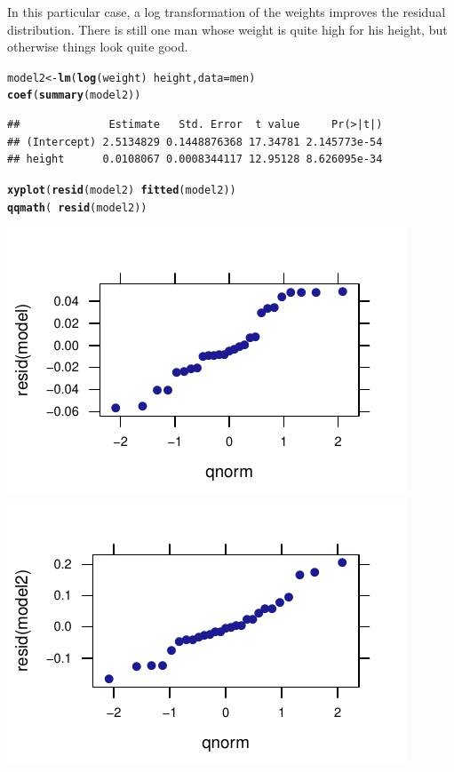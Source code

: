 \documentclass[twoside]{book}\usepackage[]{graphicx}\usepackage[]{xcolor}
\makeatletter
\def\maxwidth{ %
  \ifdim\Gin@nat@width>\linewidth
    \linewidth
  \else
    \Gin@nat@width
  \fi
}
\newcommand{\hlopt}[1]{\textcolor[rgb]{0,0,0}{#1}}%
\newcommand{\hlstd}[1]{\textcolor[rgb]{0.345,0.345,0.345}{#1}}%
\newcommand{\hlkwb}[1]{\textcolor[rgb]{0.69,0.353,0.396}{#1}}%
\newcommand{\hlkwc}[1]{\textcolor[rgb]{0.333,0.667,0.333}{#1}}%
\newcommand{\hlkwd}[1]{\textcolor[rgb]{0.737,0.353,0.396}{\textbf{#1}}}%
\newenvironment{kframe}{%
 \def\at@end@of@kframe{}%
 \ifinner\ifhmode%
  \def\at@end@of@kframe{\end{minipage}}%
  \begin{minipage}{\columnwidth}%
 \fi\fi%
 \def\FrameCommand##1{\hskip\@totalleftmargin \hskip-\fboxsep
 \colorbox{shadecolor}{##1}\hskip-\fboxsep
     \hskip-\linewidth \hskip-\@totalleftmargin \hskip\columnwidth}%
 \MakeFramed {\advance\hsize-\width
   \@totalleftmargin\z@ \linewidth\hsize
   \@setminipage}}%
 {\par\unskip\endMakeFramed%
 \at@end@of@kframe}
\newenvironment{knitrout}{}{} %
\makeatother
\begin{document}
\begin{solution}
\begin{enumerate}
In this particular case, a log transformation of the weights improves the
residual distribution.  There is still one man whose weight is quite high for
his height, but otherwise things look quite good.
\begin{knitrout}
\color{fgcolor}\begin{kframe}
\begin{alltt}
\hlstd{model2} \hlkwb{<-} \hlkwd{lm}\hlstd{(}\hlkwd{log}\hlstd{(weight)} \hlopt{~} \hlstd{height,} \hlkwc{data} \hlstd{= men)}
\hlkwd{coef}\hlstd{(}\hlkwd{summary}\hlstd{(model2))}
\end{alltt}
\begin{verbatim}
##              Estimate   Std. Error  t value     Pr(>|t|)
## (Intercept) 2.5134829 0.1448876368 17.34781 2.145773e-54
## height      0.0108067 0.0008344117 12.95128 8.626095e-34
\end{verbatim}
\begin{alltt}
\hlkwd{xyplot}\hlstd{(}\hlkwd{resid}\hlstd{(model2)} \hlopt{~} \hlkwd{fitted}\hlstd{(model2))}
\hlkwd{qqmath}\hlstd{(}\hlopt{~}\hlkwd{resid}\hlstd{(model2))}
\end{alltt}
\end{kframe}

{\centering \includegraphics[width=\maxwidth]{figures/fig-unnamed-chunk-213-1} 
\includegraphics[width=\maxwidth]{figures/fig-unnamed-chunk-213-2} 

}
\end{knitrout}
\end{enumerate}
\end{solution}
\end{document}
